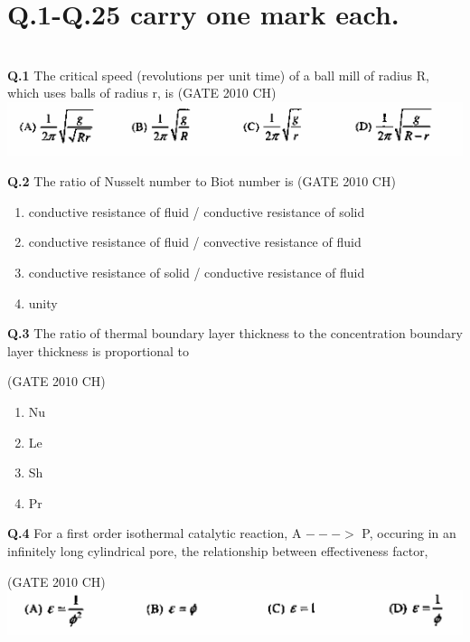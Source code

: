 \documentclass[journal,12pt,onecolumn]{exam}
\theoremstyle{remark}
\begin{document}
 \section{Q.1-Q.25 carry one mark each.}\\
 
 \noindent
 \textbf{Q.1}
    The critical speed (revolutions per unit time) of a ball mill of radius R, which uses balls of radius r, is 
\hfill{(GATE 2010 CH)}\\


    \includegraphics[width=1\linewidth]{images/Q.1 options.png}
   
   

 \noindent\textbf{Q.2}
   The ratio of Nusselt number to Biot number is
   \hfill{(GATE 2010 CH)}\\
\begin{enumerate}
    \item conductive resistance of fluid / conductive resistance of solid
    \item conductive resistance of fluid / convective resistance of fluid
    \item conductive resistance of solid / conductive resistance of fluid 
    \item unity
\end{enumerate}
\noindent
\textbf{Q.3}
  The ratio of thermal boundary layer thickness to the concentration boundary layer thickness is proportional to
  
  \hfill{(GATE 2010 CH)}\\
  
\begin{enumerate}
  \item Nu
  \item Le
  \item Sh
  \item Pr
\end{enumerate}
 \noindent
 \textbf{Q.4}
  For a first order isothermal catalytic reaction, A $--->$ P, occuring in an infinitely long cylindrical pore, the relationship between effectiveness factor,
  
\hfill{(GATE 2010 CH)}\\
 \includegraphics[width=1\linewidth]{images/Q.2 optons.png}
     
\end{document}

